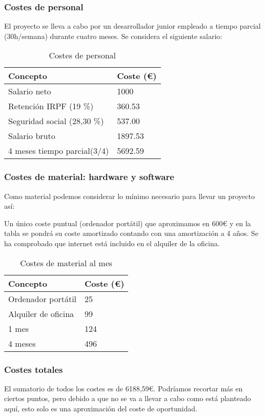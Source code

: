\subsubsection{Costes de personal}
El proyecto se lleva a cabo por un desarrollador junior empleado a tiempo parcial (30h/semana) durante cuatro meses. Se considera el siguiente salario:

\FloatBarrier
\begin{table}[]
\centering
\begin{tabular}{@{}ll@{}}
\toprule
Concepto & Coste (\euro{}) \\ \midrule
Salario neto & 1000 \\
Retención IRPF (19 \%) & 360.53 \\
Seguridad social (28,30 \%) & 537.00 \\
Salario bruto & 1897.53 \\ \midrule
4 meses tiempo parcial(3/4) & 5692.59 \\ \bottomrule
\end{tabular}
\caption{Costes de personal}
\label{Salario}
\end{table}

\subsubsection{Costes de material: hardware y software}

Como material podemos considerar lo mínimo necesario para llevar un proyecto así:

Un único coste puntual (ordenador portátil) que aproximamos en 600\euro{} y en la tabla se pondrá su coste amortizado contando con una amortización a 4 años. Se ha comprobado que internet está incluido en el alquiler de la oficina.
\FloatBarrier
\begin{table}[]
\centering
\begin{tabular}{@{}ll@{}}
\toprule
Concepto & Coste (\euro{}) \\ \midrule
Ordenador portátil & 25 \\
Alquiler de oficina & 99 \\
1 mes & 124 \\ \midrule
4 meses  & 496 \\ \bottomrule
\end{tabular}
\caption{Costes de material al mes}
\label{Costes mensualmente}
\end{table}


\subsubsection{Costes totales}
El sumatorio de todos los costes es de 6188,59\euro{}. Podríamos recortar más en ciertos puntos, pero debido a que no se va a llevar a cabo como está planteado aquí, esto solo es una aproximación del coste de oportunidad.




